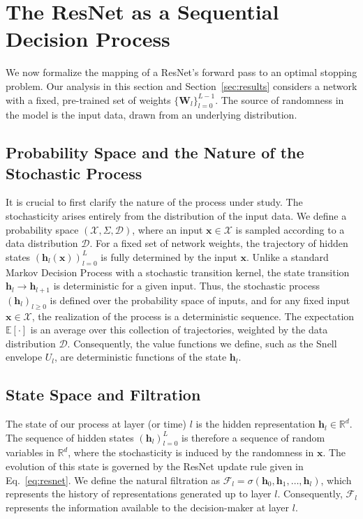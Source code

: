 \documentclass[12pt]{imsart}
\newcommand{\R}{\mathbb{R}}
\newcommand{\E}{\mathbb{E}}
\newcommand{\F}{\mathcal{F}}
\newcommand{\h}{\mathbf{h}}
\newcommand{\x}{\mathbf{x}}
\newcommand{\W}{\mathbf{W}}
\theoremstyle{plain}
\theoremstyle{definition}
\begin{document}
\section{The ResNet as a Sequential Decision Process}
\label{sec:model}

We now formalize the mapping of a ResNet's forward pass to an optimal stopping problem. Our analysis in this section and Section~\ref{sec:results} considers a network with a fixed, pre-trained set of weights $\{\W_l\}_{l=0}^{L-1}$. The source of randomness in the model is the input data, drawn from an underlying distribution.

\subsection{Probability Space and the Nature of the Stochastic Process}
It is crucial to first clarify the nature of the process under study. The stochasticity arises entirely from the distribution of the input data. We define a probability space $(\mathcal{X}, \Sigma, \mathcal{D})$, where an input $\x \in \mathcal{X}$ is sampled according to a data distribution $\mathcal{D}$. For a fixed set of network weights, the trajectory of hidden states $(\h_l(\x))_{l=0}^L$ is fully determined by the input $\x$. Unlike a standard Markov Decision Process with a stochastic transition kernel, the state transition $\h_l \to \h_{l+1}$ is deterministic for a given input. Thus, the stochastic process $(\h_l)_{l \ge 0}$ is defined over the probability space of inputs, and for any fixed input $\x \in \mathcal{X}$, the realization of the process is a deterministic sequence. The expectation $\E[\cdot]$ is an average over this collection of trajectories, weighted by the data distribution $\mathcal{D}$. Consequently, the value functions we define, such as the Snell envelope $U_l$, are deterministic functions of the state $\h_l$.

\subsection{State Space and Filtration}
The state of our process at layer (or time) $l$ is the hidden representation $\h_l \in \R^d$. The sequence of hidden states $(\h_l)_{l=0}^L$ is therefore a sequence of random variables in $\R^d$, where the stochasticity is induced by the randomness in $\x$. The evolution of this state is governed by the ResNet update rule given in Eq.~\eqref{eq:resnet}. We define the natural filtration as $\F_l = \sigma(\h_0, \h_1, \dots, \h_l)$, which represents the history of representations generated up to layer $l$. Consequently, $\F_l$ represents the information available to the decision-maker at layer $l$.
\end{document}
